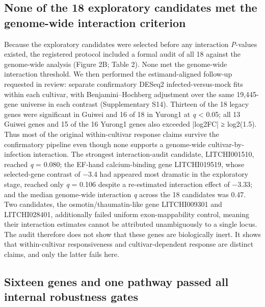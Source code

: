 \documentclass[12pt,letterpaper]{article}
\begin{document}
\subsection*{None of the 18 exploratory candidates met the genome-wide interaction criterion}

Because the exploratory candidates were selected before any interaction \textit{P}-values existed, the registered protocol included a formal audit of all 18 against the genome-wide analysis (Figure 2B; Table 2). None met the genome-wide interaction threshold. We then performed the estimand-aligned follow-up requested in review: separate confirmatory DESeq2 infected-versus-mock fits within each cultivar, with Benjamini–Hochberg adjustment over the same 19,445-gene universe in each contrast (Supplementary S14). Thirteen of the 18 legacy genes were significant in Guiwei and 16 of 18 in Yurong1 at \textit{q} < 0.05; all 13 Guiwei genes and 15 of the 16 Yurong1 genes also exceeded |log2FC| ≥ log2(1.5). Thus most of the original within-cultivar response claims survive the confirmatory pipeline even though none supports a genome-wide cultivar-by-infection interaction. The strongest interaction-audit candidate, LITCHI001510, reached \textit{q} = 0.080; the EF-hand calcium-binding gene LITCHI019519, whose selected-gene contrast of −3.4 had appeared most dramatic in the exploratory stage, reached only \textit{q} = 0.106 despite a re-estimated interaction effect of −3.33; and the median genome-wide interaction \textit{q} across the 18 candidates was 0.47. Two candidates, the osmotin/thaumatin-like gene LITCHI009301 and LITCHI028401, additionally failed uniform exon-mappability control, meaning their interaction estimates cannot be attributed unambiguously to a single locus. The audit therefore does not show that these genes are biologically inert. It shows that within-cultivar responsiveness and cultivar-dependent response are distinct claims, and only the latter fails here.

\subsection*{Sixteen genes and one pathway passed all internal robustness gates}
\end{document}
